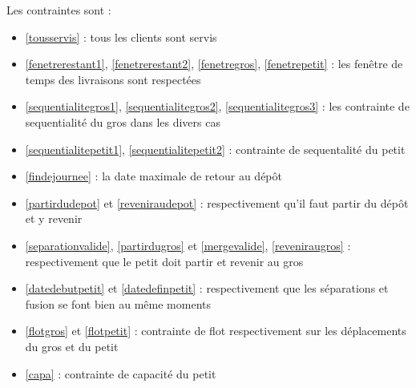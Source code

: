 \documentclass[12pt,a4paper,fleqn]{article}
\begin{document}
Les contraintes sont :
\begin{itemize}
\item \ref{tousservis} : tous les clients sont servis
\item \ref{fenetrerestant1}, \ref{fenetrerestant2}, \ref{fenetregros}, \ref{fenetrepetit} : les fenêtre de temps des livraisons sont respectées
\item \ref{sequentialitegros1}, \ref{sequentialitegros2}, \ref{sequentialitegros3} : les contrainte de sequentialité du gros dans les divers cas
\item \ref{sequentialitepetit1}, \ref{sequentialitepetit2} : contrainte de sequentalité du petit
\item \ref{findejournee} : la date maximale de retour au dépôt
\item \ref{partirdudepot} et \ref{reveniraudepot} : respectivement qu'il faut partir du dépôt et y revenir
\item \ref{separationvalide}, \ref{partirdugros} et \ref{mergevalide}, \ref{reveniraugros} : respectivement que le petit doit partir et revenir au gros
\item \ref{datedebutpetit} et \ref{datedefinpetit} : respectivement que les séparations et fusion se font bien au même moments
\item \ref{flotgros} et \ref{flotpetit} : contrainte de flot respectivement sur les déplacements du gros et du petit
\item \ref{capa} : contrainte de capacité du petit 
\end{itemize}
\end{document}
